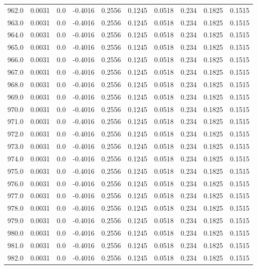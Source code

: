 \begin{longtable}{lrrrrrrrrr}
962.0 & 0.0031 & 0.0 & -0.4016 & 0.2556 & 0.1245 & 0.0518 & 0.234 & 0.1825 & 0.1515 \\
963.0 & 0.0031 & 0.0 & -0.4016 & 0.2556 & 0.1245 & 0.0518 & 0.234 & 0.1825 & 0.1515 \\
964.0 & 0.0031 & 0.0 & -0.4016 & 0.2556 & 0.1245 & 0.0518 & 0.234 & 0.1825 & 0.1515 \\
965.0 & 0.0031 & 0.0 & -0.4016 & 0.2556 & 0.1245 & 0.0518 & 0.234 & 0.1825 & 0.1515 \\
966.0 & 0.0031 & 0.0 & -0.4016 & 0.2556 & 0.1245 & 0.0518 & 0.234 & 0.1825 & 0.1515 \\
967.0 & 0.0031 & 0.0 & -0.4016 & 0.2556 & 0.1245 & 0.0518 & 0.234 & 0.1825 & 0.1515 \\
968.0 & 0.0031 & 0.0 & -0.4016 & 0.2556 & 0.1245 & 0.0518 & 0.234 & 0.1825 & 0.1515 \\
969.0 & 0.0031 & 0.0 & -0.4016 & 0.2556 & 0.1245 & 0.0518 & 0.234 & 0.1825 & 0.1515 \\
970.0 & 0.0031 & 0.0 & -0.4016 & 0.2556 & 0.1245 & 0.0518 & 0.234 & 0.1825 & 0.1515 \\
971.0 & 0.0031 & 0.0 & -0.4016 & 0.2556 & 0.1245 & 0.0518 & 0.234 & 0.1825 & 0.1515 \\
972.0 & 0.0031 & 0.0 & -0.4016 & 0.2556 & 0.1245 & 0.0518 & 0.234 & 0.1825 & 0.1515 \\
973.0 & 0.0031 & 0.0 & -0.4016 & 0.2556 & 0.1245 & 0.0518 & 0.234 & 0.1825 & 0.1515 \\
974.0 & 0.0031 & 0.0 & -0.4016 & 0.2556 & 0.1245 & 0.0518 & 0.234 & 0.1825 & 0.1515 \\
975.0 & 0.0031 & 0.0 & -0.4016 & 0.2556 & 0.1245 & 0.0518 & 0.234 & 0.1825 & 0.1515 \\
976.0 & 0.0031 & 0.0 & -0.4016 & 0.2556 & 0.1245 & 0.0518 & 0.234 & 0.1825 & 0.1515 \\
977.0 & 0.0031 & 0.0 & -0.4016 & 0.2556 & 0.1245 & 0.0518 & 0.234 & 0.1825 & 0.1515 \\
978.0 & 0.0031 & 0.0 & -0.4016 & 0.2556 & 0.1245 & 0.0518 & 0.234 & 0.1825 & 0.1515 \\
979.0 & 0.0031 & 0.0 & -0.4016 & 0.2556 & 0.1245 & 0.0518 & 0.234 & 0.1825 & 0.1515 \\
980.0 & 0.0031 & 0.0 & -0.4016 & 0.2556 & 0.1245 & 0.0518 & 0.234 & 0.1825 & 0.1515 \\
981.0 & 0.0031 & 0.0 & -0.4016 & 0.2556 & 0.1245 & 0.0518 & 0.234 & 0.1825 & 0.1515 \\
982.0 & 0.0031 & 0.0 & -0.4016 & 0.2556 & 0.1245 & 0.0518 & 0.234 & 0.1825 & 0.1515 \\

\end{longtable}
